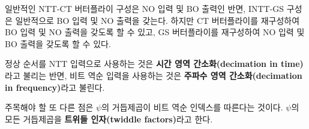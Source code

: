 일반적인 NTT-CT 버터플라이 구성은 NO 입력 및 BO 출력인 반면, INTT-GS 구성은 일반적으로 BO 입력 및 NO 출력을 갖는다. 하지만 CT 버터플라이를 재구성하여 BO 입력 및 NO 출력을 갖도록 할 수 있고, GS 버터플라이를 재구성하여 NO 입력 및 BO 출력을 갖도록 할 수 있다.

정상 순서를 NTT 입력으로 사용하는 것은 \textbf{시간 영역 간소화(decimation in time)}라고 불리는 반면, 비트 역순 입력을 사용하는 것은 \textbf{주파수 영역 간소화(decimation in frequency)}라고 불린다.

주목해야 할 또 다른 점은 $\psi$의 거듭제곱이 비트 역순 인덱스를 따른다는 것이다. $\psi$의 모든 거듭제곱을 \textbf{트위들 인자(twiddle factors)}라고 한다.